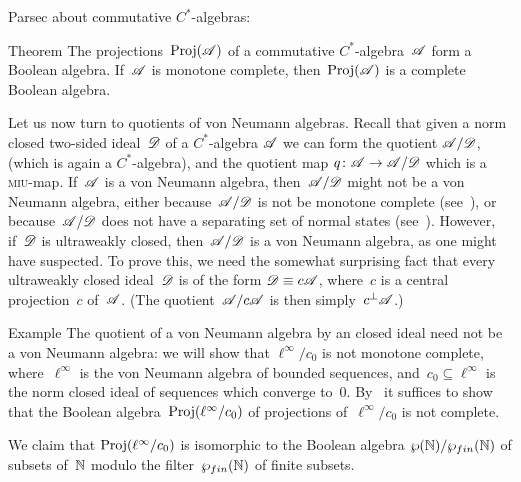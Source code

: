 \documentclass[a]{subfiles}
\begin{document}
\begin{parsec}%
\begin{point}%
Parsec about commutative $C^*$-algebras:
\end{point}
\begin{point}{Theorem}%
The projections~$\operatorname{Proj}(\mathscr{A})$ of a commutative $C^*$-algebra~$\mathscr{A}$
form a Boolean algebra.
If~$\mathscr{A}$ is monotone complete,
then~$\operatorname{Proj}(\mathscr{A})$ is a complete Boolean algebra.
\end{point}
\end{parsec}

\begin{parsec}%
\begin{point}%
Let us now turn to quotients of von Neumann algebras.
Recall that given a norm closed two-sided ideal~$\mathscr{D}$
of a $C^*$-algebra $\mathscr{A}$
we can form the quotient $\mathscr{A}/\mathscr{D}$,
(which is again a $C^*$-algebra),
and the quotient map $q\colon \mathscr{A}\to \mathscr{A}/\mathscr{D}$
which is a \textsc{miu}-map.
If~$\mathscr{A}$ is a von Neumann algebra,
then~$\mathscr{A}/\mathscr{D}$ might not be a von Neumann algebra,
either because~$\mathscr{A}/\mathscr{D}$ is not be monotone complete 
(see~),
or because~$\mathscr{A}/\mathscr{D}$ does not have a separating set of normal states
(see~\TODO{}).
However, if~$\mathscr{D}$ is ultraweakly closed,
then~$\mathscr{A}/\mathscr{D}$ is a von Neumann algebra,
as one might have suspected.
To prove this,
we need the somewhat surprising
fact that every ultraweakly closed
ideal~$\mathscr{D}$ is of the form $\mathscr{D}\equiv c\mathscr{A}$,
where~$c$ is a central projection~$c$ of~$\mathscr{A}$.
(The quotient~$\mathscr{A}/c\mathscr{A}$ is then simply~$c^\perp\mathscr{A}$.)
\end{point}
\begin{point}{Example}%
The quotient of a von Neumann algebra
by an closed ideal
need not be a von Neumann algebra:
we will show that $\ell^\infty/c_0$
is not monotone complete,
where~$\ell^\infty$ is the von Neumann algebra
of bounded sequences,
and~$c_0\subseteq \ell^\infty$
is the norm closed ideal of
sequences which converge to~$0$.
By~
it suffices to show that the Boolean algebra~$\operatorname{Proj}(\ell^\infty/c_0)$
of projections of~$\ell^\infty/c_0$ is not complete.
\begin{point}%
We claim that $\operatorname{Proj}(\ell^\infty/c_0)$
is isomorphic to the Boolean algebra
 $\wp(\mathbb{N})/\wp_{fin}(\mathbb{N})$
of subsets of~$\mathbb{N}$ modulo 
the filter~$\wp_{fin}(\mathbb{N})$ of finite subsets.


\end{point}
\end{point}
\end{parsec}
\end{document}

